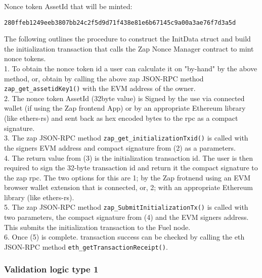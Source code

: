 Nonce token AssetId that will be minted:
\begin{small}
    \begin{verbatim}
280ffeb1249eeb3807bb24c2f5d9d71f438e81e6b67145c9a00a3ae76f7d3a5d
\end{verbatim}
\end{small}


The following outlines the procedure to construct the InitData struct and build the initialization transaction that calls the Zap Nonce Manager
contract to mint nonce tokens.\\

1. To obtain the nonce token id a user can calculate it on "by-hand" by the above method, or, obtain by calling the above zap JSON-RPC method \texttt{zap\_get\_assetidKey1()} with the EVM address
of the owner.\\

2. The nonce token AssetId (32byte value) is Signed by the use via connected wallet (if using the Zap frontend App) or by an appropriate Ethereum library (like ethers-rs)
and sent back as hex encoded bytes to the rpc as a compact signature.\\

3. The zap JSON-RPC method \texttt{zap\_get\_initializationTxid()} is called with the signers EVM address and compact signature from (2) as a parameters.\\

4. The return value from (3) is the initialization transaction id. The user is then required to sign the 32-byte transaction id and return it the compact signature
to the zap rpc. The two options for this are 1; by the Zap frotnend using an EVM browser wallet extension that is connected, or, 2; with an appropriate
Ethereum library (like ethers-rs).\\

5. The zap JSON-RPC method \texttt{zap\_SubmitInitializationTx()} is called with two parameters, the compact signature from (4) and the EVM
signers address. This submits the initialization transaction to the Fuel node.\\

6. Once (5) is complete. transaction success can be checked by calling the eth JSON-RPC method \texttt{eth\_getTransactionReceipt()}.\\



\subsubsection{Validation logic type 1}


